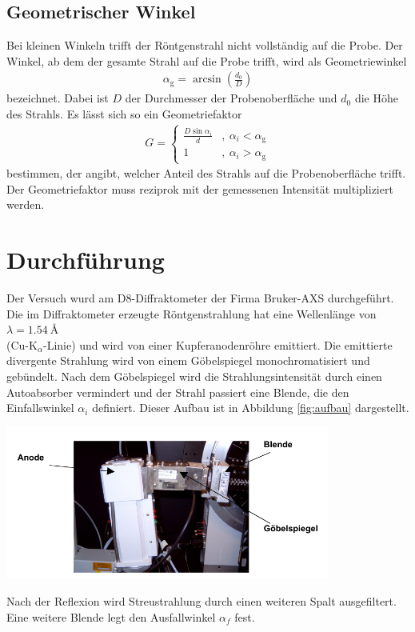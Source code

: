 \documentclass[captions=tableheading]{scrartcl}
\newcommand{\indx}[1]{\text{#1}}
\begin{document}
\subsection{Geometrischer Winkel}
Bei kleinen Winkeln trifft der Röntgenstrahl nicht vollständig auf die Probe. Der Winkel, ab dem der gesamte Strahl auf die Probe trifft, wird als Geometriewinkel 
\begin{align}
\alpha_{\indx{g}}=\arcsin \left( \frac{d_0}{D} \right)
\end{align}
bezeichnet. 
Dabei ist $D$ der Durchmesser der Probenoberfläche und $d_0$ die Höhe des Strahls.
Es lässt sich so ein Geometriefaktor 
\begin{align}
G=\left\lbrace\begin{matrix}
\frac{D \sin \alpha_{i} }{d} &,\ \alpha_{i} < \alpha_{\indx{g}} \\
1 &,\  \alpha_{i} > \alpha_{\indx{g}}
\end{matrix}\right.
\label{eq:geometriefaktor}
\end{align}
bestimmen, der angibt, welcher Anteil des Strahls auf die Probenoberfläche trifft.
Der Geometriefaktor muss reziprok mit der gemessenen Intensität multipliziert werden.

\section{Durchführung}
Der Versuch wurd am D8-Diffraktometer der Firma Bruker-AXS durchgeführt. Die im Diffraktometer erzeugte Röntgenstrahlung hat eine Wellenlänge von $\lambda=\SI{1.54}{\angstrom}$ \\ (Cu-K$_{\alpha}$-Linie) und wird von einer Kupferanodenröhre emittiert. Die emittierte divergente Strahlung wird von einem Göbelspiegel monochromatisiert und gebündelt. Nach dem Göbelspiegel wird die Strahlungsintensität durch einen Autoabsorber vermindert und der Strahl passiert eine Blende, die den Einfallswinkel $\alpha_i$ definiert. Dieser Aufbau ist in Abbildung \ref{fig:aufbau} dargestellt.
\begin{center}
	\includegraphics[width=0.8\textwidth]{images/aufbau.png}
	\label{fig:aufbau}
\end{center}
Nach der Reflexion wird Streustrahlung durch einen weiteren Spalt ausgefiltert. Eine weitere Blende legt den Ausfallwinkel $\alpha_f$ fest. \\
\end{document}
